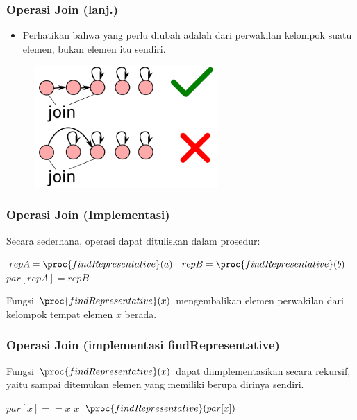 \begin{frame}
\frametitle{Operasi Join (lanj.)}
\begin{itemize}
  \item Perhatikan bahwa yang perlu diubah adalah  dari perwakilan kelompok suatu elemen, bukan elemen itu sendiri.
\end{itemize}
\begin{figure}
  \includegraphics[width=7cm]{asset/djs-join-2.pdf}
\end{figure}
\end{frame}

\begin{frame}
\frametitle{Operasi Join (Implementasi)}
Secara sederhana, operasi  dapat dituliskan dalam prosedur:

\begin{codebox}
\li $repA = \proc{findRepresentative}(a)$
\li $repB = \proc{findRepresentative}(b)$
\li $par[repA] = repB$
\end{codebox}

Fungsi $\proc{findRepresentative}(x)$ mengembalikan elemen perwakilan dari kelompok tempat elemen $x$ berada.
\end{frame}

\begin{frame}
\frametitle{Operasi Join (implementasi findRepresentative)}
Fungsi $\proc{findRepresentative}(x)$ dapat diimplementasikan secara rekursif, yaitu sampai ditemukan elemen yang memiliki  berupa dirinya sendiri.

\begin{codebox}
\li \If $par[x] == x$ \Then
\li   \Return $x$
\li \Else
\li   \Return $\proc{findRepresentative}(par[x])$
    \End
\end{codebox}
\end{frame}

